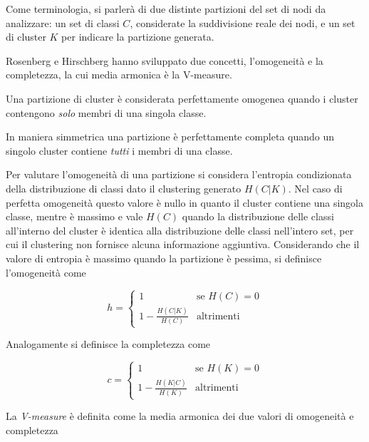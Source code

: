 \documentclass[12pt,a4paper,twoside]{report}
\begin{document}

Come terminologia, si parlerà di due distinte partizioni del set di nodi da analizzare: un set di
classi $C$, considerate la suddivisione reale dei nodi, e un set di cluster $K$ per indicare la
partizione generata.

Rosenberg e Hirschberg hanno sviluppato due concetti, l'omogeneità e la completezza, la cui media
armonica è la V-measure.

Una partizione di cluster è considerata perfettamente omogenea quando i cluster contengono
\textit{solo} membri di una singola classe.

In maniera simmetrica una partizione è perfettamente completa quando un singolo cluster contiene
\textit{tutti} i membri di una classe.

Per valutare l'omogeneità di una partizione si considera l'entropia condizionata della distribuzione
di classi dato il clustering generato $H(C|K)$. Nel caso di perfetta omogeneità questo valore è
nullo in quanto il cluster contiene una singola classe, mentre è massimo e vale $H(C)$ quando la
distribuzione delle classi all'interno del cluster è identica alla distribuzione delle classi
nell'intero set, per cui il clustering non fornisce alcuna informazione aggiuntiva. Considerando che
il valore di entropia è massimo quando la partizione è pessima, si definisce l'omogeneità come

\begin{equation} \label{eq:h}
    h = \begin{cases} 1 & \mbox{se } H(C) = 0 \\ 1-\frac{H(C|K)}{H(C)} & \mbox{altrimenti} \end{cases}
\end{equation}

Analogamente si definisce la completezza come

\begin{equation} \label{eq:c}
    c = \begin{cases} 1 & \mbox{se } H(K) = 0 \\ 1-\frac{H(K|C)}{H(K)} & \mbox{altrimenti} \end{cases}
\end{equation}

La \textit{V-measure} è definita come la media armonica dei due valori di omogeneità e completezza
\end{document}
